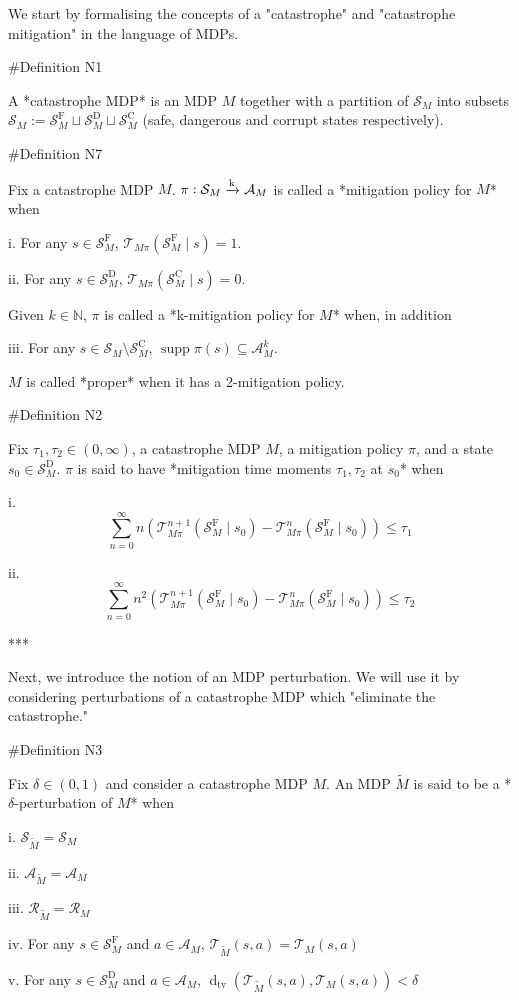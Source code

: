 \documentclass[a4paper]{article}
\DeclareMathOperator{\Supp}{supp}
\newcommand{\AP}[1]{\left(#1\right)}
\newcommand{\Dtva}[1]{\operatorname{d}_{\text{tv}}\AP{#1}}
\newcommand{\Nats}{\mathbb{N}}
\newcommand{\M}{\xrightarrow{\textnormal{k}}}
\newcommand{\A}{\mathcal{A}}
\newcommand{\St}{\mathcal{S}}
\newcommand{\T}{\mathcal{T}}
\newcommand{\R}{\mathcal{R}}
\newcommand{\RMC}{\mathrm{C}}
\newcommand{\RMD}{\mathrm{D}}
\newcommand{\RMF}{\mathrm{F}}
\newcommand{\SF}{\St^{\RMF}}
\newcommand{\SD}{\St^{\RMD}}
\newcommand{\SC}{\St^{\RMC}}
\begin{document}
We start by formalising the concepts of a "catastrophe" and "catastrophe mitigation" in the language of MDPs.

\#Definition N1

A *catastrophe MDP* is an MDP $M$ together with a partition of $\St_M$ into subsets $\St_M:=\SF_M \sqcup \SD_M \sqcup \SC_M$ (safe, dangerous and corrupt states respectively). 

\#Definition N7

Fix a catastrophe MDP $M$. $\pi: \St_M \M \A_M$ is called a *mitigation policy for $M$* when

i. For any $s \in \SF_M$, $\T_{M\pi}\AP{\SF_M \mid s}=1$.

ii. For any $s \in \SD_M$, $\T_{M\pi}\AP{\SC_M \mid s}=0$.

Given $k \in \Nats$, $\pi$ is called a *k-mitigation policy for $M$* when, in addition

iii. For any $s \in \St_M \setminus \SC_M$, $\Supp{\pi(s)} \subseteq \A_M^k$.

$M$ is called *proper* when it has a 2-mitigation policy.

\#Definition N2

Fix $\tau_1,\tau_2 \in (0,\infty)$, a catastrophe MDP $M$, a mitigation policy $\pi$, and a state $s_0 \in \SD_M$. $\pi$ is said to have *mitigation time moments $\tau_1,\tau_2$ at $s_0$* when

i. $$\sum_{n=0}^\infty n \AP{\T_{M\pi}^{n+1}\AP{\SF_M \mid s_0}-\T_{M\pi}^{n}\AP{\SF_M \mid s_0}} \leq \tau_1$$

ii. $$\sum_{n=0}^\infty n^2 \AP{\T_{M\pi}^{n+1}\AP{\SF_M \mid s_0}-\T_{M\pi}^{n}\AP{\SF_M \mid s_0}} \leq \tau_2$$

***

Next, we introduce the notion of an MDP perturbation. We will use it by considering perturbations of a catastrophe MDP which "eliminate the catastrophe."

\#Definition N3

Fix $\delta\in(0,1)$ and consider a catastrophe MDP $M$. An MDP $\tilde{M}$ is said to be a *$\delta$-perturbation of $M$* when

i. $\St_{\tilde{M}} = \St_M$

ii. $\A_{\tilde{M}} = \A_M$

iii. $\R_{\tilde{M}}=\R_M$

iv. For any $s \in \SF_M$ and $a \in \A_M$, $\T_{\tilde{M}}\AP{s,a}=\T_{M}\AP{s,a}$

v. For any $s \in \SD_M$ and $a \in \A_M$, $\Dtva{\T_{\tilde{M}}\AP{s,a},\T_{M}\AP{s,a}} < \delta$
\end{document}
